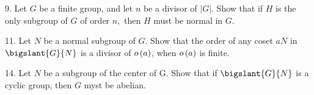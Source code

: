 \begin{mdframed}[style=darkAnswer,frametitle={Joe Starr}]
\end{mdframed}
\newpage
\begin{mdframed}[style=darkQuesion]
  9. Let $G$ be a finite group, and let $n$ be a divisor of $|G| .$ Show that if $H$ is the only subgroup of $G$ of order $n,$ then $H$ must be normal in $G .$
  
\end{mdframed}
\begin{mdframed}[style=darkAnswer,frametitle={Joe Starr}]
\end{mdframed}
\newpage
\begin{mdframed}[style=darkQuesion]
  11. Let $N$ be a normal subgroup of $G$. Show that the order of any coset $aN$
  in $\bigslant{G}{N}$ is a divisor of $o\left(a\right)$, when $o\left(a\right)$ is finite. 
\end{mdframed}
\begin{mdframed}[style=darkAnswer,frametitle={Joe Starr}]
\end{mdframed}
\newpage
\begin{mdframed}[style=darkQuesion]
  14. Let $N$ be a subgroup of the center of G. Show that if $\bigslant{G}{N}$ 
  is a cyclic group, then $G$ myst be abelian. 
\end{mdframed}
